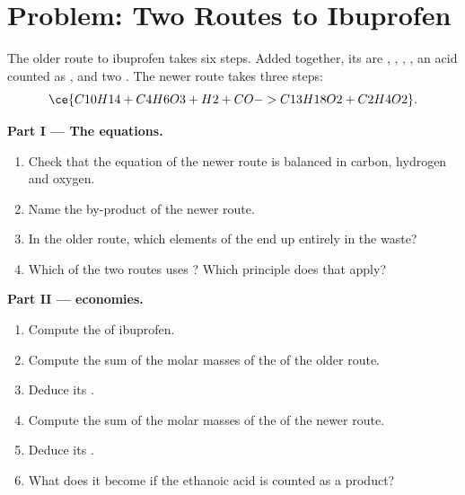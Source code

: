 \section{Problem: Two Routes to Ibuprofen}

\begin{problem}
\label{pb:g12:synthesis-strategy:1}
The older route to ibuprofen  takes six steps. Added
together, its  are , ,
, , an acid counted as ,
 and two . The newer route takes three steps:
\[
  \ce{C10H14 + C4H6O3 + H2 + CO -> C13H18O2 + C2H4O2} .
\]

\medskip
\noindent\textbf{Part I --- The equations.}
\begin{enumerate}
  \item Check that the equation of the newer route is balanced in carbon,
        hydrogen and oxygen.
  \item Name the by-product of the newer route.
  \item In the older route, which elements of the  end up
        entirely in the waste?
  \item Which of the two routes uses ? Which principle does that
        apply?
\end{enumerate}

\medskip
\noindent\textbf{Part II ---  economies.}
\begin{enumerate}[resume]
  \item Compute the  of ibuprofen.
  \item Compute the sum of the molar masses of the  of the older
        route.
  \item Deduce its .
  \item Compute the sum of the molar masses of the  of the newer
        route.
  \item Deduce its .
  \item What does it become if the ethanoic acid is counted as a
        product?
\end{enumerate}


\end{problem}
